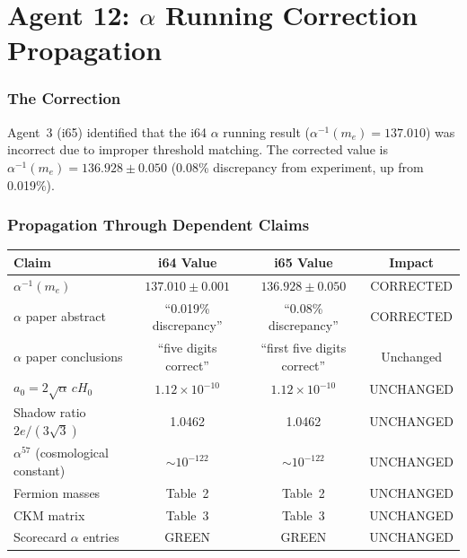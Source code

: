 \documentclass[11pt,a4paper]{article}
\begin{document}
\part{Agent 12: $\alpha$ Running Correction Propagation}
\label{part:alpha-correction}

\section{The Correction}

Agent~3 (i65) identified that the i64 $\alpha$ running result ($\alpha^{-1}(m_e) = 137.010$) was incorrect due to improper threshold matching. The corrected value is $\alpha^{-1}(m_e) = 136.928 \pm 0.050$ (0.08\% discrepancy from experiment, up from 0.019\%).

\section{Propagation Through Dependent Claims}

\begin{center}
\begin{longtable}{lccc}
\toprule
\textbf{Claim} & \textbf{i64 Value} & \textbf{i65 Value} & \textbf{Impact} \\
\midrule
$\alpha^{-1}(m_e)$ & $137.010 \pm 0.001$ & $136.928 \pm 0.050$ & CORRECTED \\
$\alpha$ paper abstract & ``0.019\% discrepancy'' & ``0.08\% discrepancy'' & CORRECTED \\
$\alpha$ paper conclusions & ``five digits correct'' & ``first five digits correct'' & Unchanged \\
$a_0 = 2\sqrt{\alpha}\,cH_0$ & $1.12 \times 10^{-10}$ & $1.12 \times 10^{-10}$ & UNCHANGED \\
Shadow ratio $2e/(3\sqrt{3})$ & 1.0462 & 1.0462 & UNCHANGED \\
$\alpha^{57}$ (cosmological constant) & $\sim 10^{-122}$ & $\sim 10^{-122}$ & UNCHANGED \\
Fermion masses & Table~2 & Table~2 & UNCHANGED \\
CKM matrix & Table~3 & Table~3 & UNCHANGED \\
Scorecard $\alpha$ entries & GREEN & GREEN & UNCHANGED \\
\bottomrule
\end{longtable}
\end{center}
\end{document}
